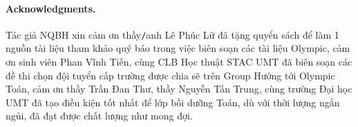 \documentclass{article}
\begin{document}

\paragraph{Acknowledgments.} Tác giả NQBH xin cảm ơn thầy{\tt/}anh {\sc Lê Phúc Lữ} đã tặng quyển sách \cite{Vinh_Lu_Olympic_Toan} để làm 1 nguồn tài liệu tham khảo quý báo trong việc biên soạn các tài liệu Olympic, cảm ơn sinh viên {\sc Phan Vĩnh Tiến}, cùng CLB Học thuật STAC UMT đã biên soạn các đề thi chọn đội tuyển cấp trường được chia sẽ trên Group Hướng tới Olympic Toán, cảm ơn thầy {\sc Trần Đan Thư}, thầy {\sc Nguyễn Tấn Trung}, cùng trường Đại học UMT đã tạo điều kiện tốt nhất để lớp bồi dưỡng Toán, dù với thời lượng ngắn ngủi, đã đạt được chất lượng như mong đợi.


\printbibliography[heading=bibintoc]
\end{document}
